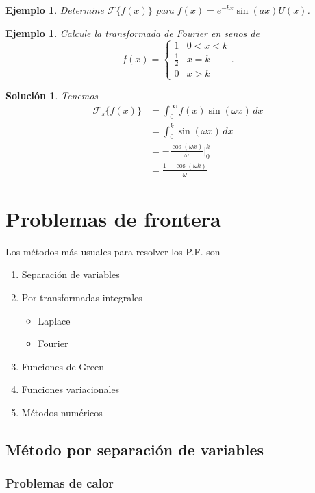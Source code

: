\documentclass[11pt,letterpaper,draft]{report}
\newtheorem{example}[defn]{Ejemplo}
\newtheorem*{sol}{Solución}
\newcommand\<{\langle}
\renewcommand\>{\rangle}
\let\cal\mathcal
\begin{document}
\begin{example}
  Determine $\cal F\{f(x)\}$ para $f(x)=e^{-bx}\sin(ax)U(x)$.
\end{example}

\begin{example}
  Calcule la transformada de Fourier en senos de
  \[
    f(x)=
    \begin{cases}
      1 & 0<x<k \\
      \frac{1}{2} & x=k \\
      0 & x>k
    \end{cases}
  .\]
\end{example}
\begin{sol}
  Tenemos
  \begin{align*}
    \cal F_s\{f(x)\}
    &= \int_{0}^{\infty}f(x)\sin(\omega x)\,dx \\
    &= \int_{0}^{k}\sin(\omega x)\,dx \\
    &= -\frac{\cos(\omega x)}{\omega}\Big|_{0}^{k} \\
    &= \frac{1-\cos(\omega k)}{\omega}
  \end{align*}
\end{sol}

\chapter{Problemas de frontera} %

Los métodos más usuales para resolver los P.F. son
\begin{enumerate}
  \item Separación de variables
  \item Por transformadas integrales
  \begin{itemize}
    \item   Laplace
    \item Fourier   
  \end{itemize}
  \item Funciones de Green
  \item Funciones variacionales
  \item Métodos numéricos
\end{enumerate}

\section{Método por separación de variables}

\subsection{Problemas de calor}
\end{document}
